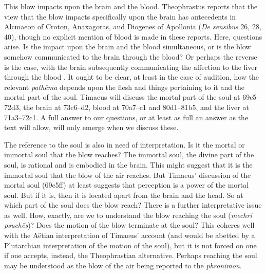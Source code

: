 This blow impacts upon the brain and the blood. Theophrastus reports that the view that the blow impacts specifically upon the brain has antecedents in Alcmaeon of Croton, Anaxagoras, and Diogenes of Apollonia (\emph{De sensibus} 26, 28, 40), though no explicit mention of blood is made in these reports. Here, questions arise. Is the impact upon the brain and the blood simultaneous, or is the blow somehow communicated to the brain through the blood? Or perhaps the reverse is the case, with the brain subsequently communicating the affection to the liver through the blood \citep[477]{Taylor:1928qb}. It ought to be clear, at least in the case of audition, how the relevant \emph{pathēma} depends upon the flesh and things pertaining to it and the mortal part of the soul. Timaeus will discuss the mortal part of the soul at 69c5--72d3, the brain at 73c6--d2, blood at 70a7--c1 and 80d1--81b5, and the liver at 71a3--72c1. A full answer to our questions, or at least as full an answer as the text will allow, will only emerge when we discuss these.

The reference to the soul is also in need of interpretation. Is it the mortal or immortal soul that the blow reaches? The immortal soul, the divine part of the soul, is rational and is embodied in the brain. This might suggest that it is the immortal soul that the blow of the air reaches. But Timaeus' discussion of the mortal soul (69c5ff) at least suggests that perception is a power of the mortal soul. But if it is, then it is located apart from the brain and the head. So at which part of the soul does the blow reach? There is a further interpretative issue as well. How, exactly, are we to understand the blow reaching the soul (\emph{mechri psuchēs})? Does the motion of the blow terminate at the soul? This coheres well with the Aëtian interpretation of Timaeus' account (and would be abetted by a Plutarchian interpretation of the motion of the soul), but it is not forced on one if one accepts, instead, the Theophrastian alternative. Perhaps reaching the soul may be understood as the blow of the air being reported to the \emph{phronimon}. 

